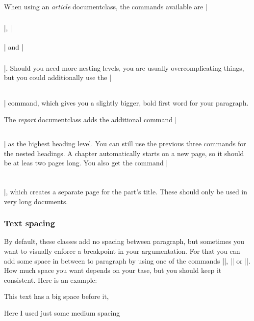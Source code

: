        When using an \emph{article} documentclass, the commands available are |\section{}|, |\subsection{}| and
        |\subsubsection{}|. Should you need more nesting levels, you are usually overcomplicating things, but you could additionally use the
        |\paragraph{}| command, which gives you a slightly bigger, bold first word for your paragraph.

        The \emph{report} documentclass adds the additional command |\chapter{}| as the highest heading level. You can still use the previous
        three commands for the nested headings. A chapter automatically starts on a new page, so it should be at leas two pages long. You also get the
        command |\part{}|, which creates a separate page for the part's title. These should only be used in very long documents.

    \section{Text spacing} \label{sec: spacing}
        By default, these classes add no spacing between paragraph, but sometimes you want to visually enforce a breakpoint in your argumentation. For
        that you can add some space in between to paragraph by using one of the commands |\bigskip|, |\medskip| or
        |\smallskip|. How much space you want depends on your tase, but you should keep it consistent. Here is an example:

        \bigskip
        This text has a big space before it,

        \medskip
        Here I used just some medium spacing

